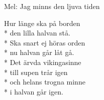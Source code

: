 \begin{SongText}
    \begin{SongInfo}
        Mel: Jag minns den ljuva tiden
    \end{SongInfo}
    \begin{SongVerse}
        Hur länge ska på borden\\*%
        den lilla halvan stå.\\*%
        Ska snart ej höras orden\\*%
        nu halvan går låt gå.\\*%
        Det ärvda vikingasinne\\*%
        till supen trår igen\\*%
        och helans trogna minne\\*%
        i halvan går igen.
    \end{SongVerse}
\end{SongText}
